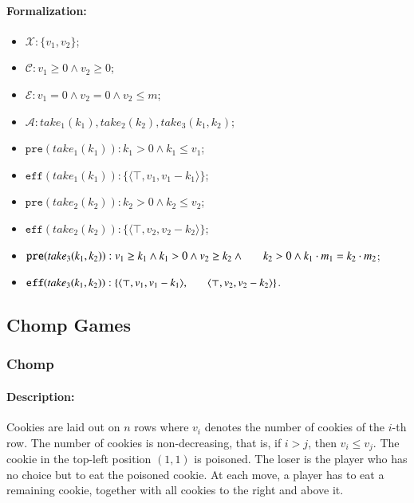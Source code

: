\documentclass[review]{elsarticle}
\newcommand{\set}[1]{\{ #1 \}}
\newcommand{\tuple}[1]{\langle {#1} \rangle}
\newcommand{\true}{\top}
\newcommand{\statevar}{\mathcal{X}}
\newcommand{\act}{\mathcal{A}}
\newcommand{\constraint}{\mathcal{C}}
\newcommand{\estate}{\mathcal{E}}
\newcommand{\pre}{\mathtt{pre}}
\newcommand{\eff}{\mathtt{eff}}
\begin{document}
\paragraph{Formalization:}
\begin{itemize}
	\item $\statevar: \set{v_1, v_2}$;
	\item $\constraint: v_1 \ge 0 \wedge  v_2 \ge 0$;
	\item $\estate: v_1 = 0\wedge v_2 = 0 \wedge v_2 \le m$;
	\item $\act:take_1(k_1), take_2(k_2), take_3(k_1,k_2)$;
	\item $\pre(take_1(k_1)) :  k_1 > 0 \wedge k_1 \le v_1$;
	\item $\eff(take_1(k_1)) : \set{\tuple{\true, v_1, v_1-k_1}}$;
	\item $\pre(take_2(k_2)) :  k_2 > 0 \wedge k_2 \le v_2$;
	\item $\eff(take_2(k_2)) : \set{\tuple{\true, v_2, v_2-k_2}}$;
	\item $\pre(take_3(k_1, k_2)) : v_1 \ge k_1 \wedge  k_1 > 0 \wedge v_2 \ge k_2 \wedge \\ \hspace*{6mm}
	k_2 > 0 \wedge k_1\cdot m_1= k_2 \cdot m_2$;
	\item $\eff(take_3(k_1,k_2)) : \set{\tuple{\true, v_1, v_1 -k_1}, \\ \hspace*{6mm}
		\tuple{\true, v_2, v_2 - k_2}}$.
\end{itemize}

\subsection{Chomp Games}
\subsubsection{Chomp \protect\cite{Sch1952}}

\paragraph{Description:}  
Cookies are laid out on $n$ rows where $v_i$ denotes the number of cookies of the $i$-th row.
The number of cookies is non-decreasing, that is, if $i > j$, then $v_i \leq v_j$.
The cookie in the top-left position $(1, 1)$ is poisoned.
The loser is the player who has no choice but to eat the poisoned cookie.
At each move, a player has to eat a remaining cookie, together with all cookies to the right and above it. 
\end{document}
